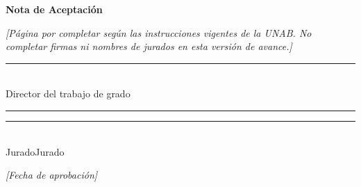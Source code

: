 \begin{titlepage}
    \thispagestyle{empty} %

    \begin{center}
        \vspace*{1.7cm}
        \textbf{Nota de Aceptación}

        \vspace{0.8cm}
        \raggedright
        \textit{[Página por completar según las instrucciones vigentes de la UNAB. No completar firmas ni nombres de jurados en esta versión de avance.]}
        \par
        \vspace{2.0cm}
        \centering

        \rule{7cm}{0.4pt} \\ %
        Director del trabajo de grado

        \vspace{3.0cm}

        \noindent
        \rule{5cm}{0.4pt}\hfill\rule{5cm}{0.4pt} \\[0.2cm]
        \hspace{0.5cm}Jurado\hfill\hspace{-1cm}Jurado

        \vspace{5.0cm}

        \textit{[Fecha de aprobación]}
    \end{center}
\end{titlepage}
